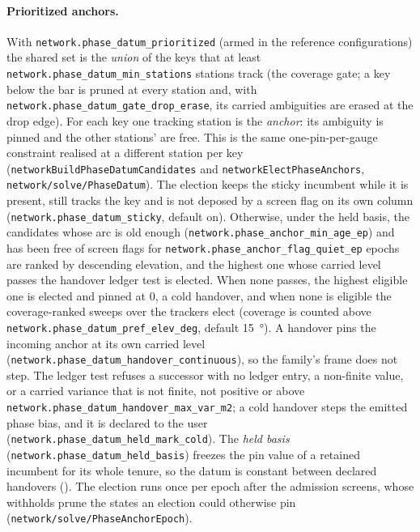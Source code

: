 \documentclass[main.tex]{subfiles}
\begin{document}
\paragraph{Prioritized anchors.}
With \texttt{network.phase\_datum\_prioritized} (armed in the reference
configurations) the shared set is the \emph{union} of the keys that at
least \texttt{network.phase\_datum\_min\_stations} stations track (the
coverage gate; a key below the bar is pruned at every station and, with
\texttt{network.phase\_datum\_gate\_drop\_erase}, its carried ambiguities
are erased at the drop edge). For each key one tracking station is the
\emph{anchor}: its ambiguity is pinned and the other stations' are free.
This is the same one-pin-per-gauge constraint realised at a different
station per key
(\texttt{networkBuildPhaseDatumCandidates} and
\texttt{networkElectPhaseAnchors}, \texttt{network/solve/PhaseDatum}).
The election keeps the sticky incumbent while it is present, still
tracks the key and is not deposed by a screen flag on its own column
(\texttt{network.phase\_datum\_sticky}, default on). Otherwise, under the
held basis, the candidates whose arc is old enough
(\texttt{network.phase\_anchor\_min\_age\_ep}) and has been free of
screen flags for \texttt{network.phase\_anchor\_flag\_quiet\_ep} epochs
are ranked by descending elevation, and the highest one whose carried
level passes the handover ledger test is elected. When none passes, the
highest eligible one is elected and pinned at $0$, a cold handover, and
when none is eligible the coverage-ranked sweeps over the trackers elect
(coverage is counted above \texttt{network.phase\_datum\_pref\_elev\_deg},
default \SI{15}{\degree}). A handover pins the incoming anchor at its own
carried level (\texttt{network.phase\_datum\_handover\_continuous}), so the
family's frame does not step. The ledger test refuses a successor with no
ledger entry, a non-finite value, or a carried variance that is not
finite, not positive or above
\texttt{network.phase\_datum\_handover\_max\_var\_m2}; a cold
handover steps the emitted phase bias, and it is declared to the user
(\texttt{network.phase\_datum\_held\_mark\_cold}). The
\emph{held basis} (\texttt{network.phase\_datum\_held\_basis}) freezes
the pin value of a retained incumbent for its whole tenure, so the datum
is constant between declared handovers
(). The
election runs once per epoch after the admission screens, whose withholds
prune the states an election could otherwise pin
(\texttt{network/solve/PhaseAnchorEpoch}).
\end{document}
